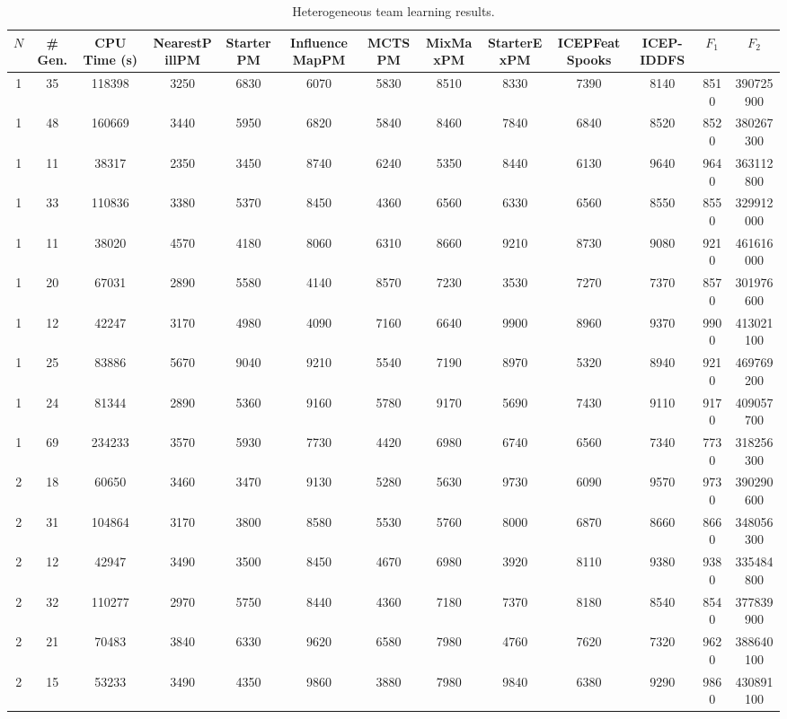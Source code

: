 \documentclass[journal]{IEEEtran}
\begin{document}
\begin{table}
\caption{Heterogeneous team learning results.}
\label{tab:results_heterogeneous}
\centering
\footnotesize
\begin{tabular}{|ccc|cccccccc|cc|}
\hline																				$N$	&	\# Gen.	&	CPU Time (s)	&	NearestPillPM	&	StarterPM	&	InfluenceMapPM	&	MCTSPM	&	MixMaxPM	&	StarterExPM	&	ICEPFeatSpooks	&	ICEP-IDDFS	&	$F_1$	&	$F_2$	\\
\hline																				1	&	35	&	118398	&	3250	&	6830	&	6070	&	5830	&	8510	&	8330	&	7390	&	8140	&	8510	&	390725900	\\
1	&	48	&	160669	&	3440	&	5950	&	6820	&	5840	&	8460	&	7840	&	6840	&	8520	&	8520	&	380267300	\\
1	&	11	&	38317	&	2350	&	3450	&	8740	&	6240	&	5350	&	8440	&	6130	&	9640	&	9640	&	363112800	\\
1	&	33	&	110836	&	3380	&	5370	&	8450	&	4360	&	6560	&	6330	&	6560	&	8550	&	8550	&	329912000	\\
1	&	11	&	38020	&	4570	&	4180	&	8060	&	6310	&	8660	&	9210	&	8730	&	9080	&	9210	&	461616000	\\
1	&	20	&	67031	&	2890	&	5580	&	4140	&	8570	&	7230	&	3530	&	7270	&	7370	&	8570	&	301976600	\\
1	&	12	&	42247	&	3170	&	4980	&	4090	&	7160	&	6640	&	9900	&	8960	&	9370	&	9900	&	413021100	\\
1	&	25	&	83886	&	5670	&	9040	&	9210	&	5540	&	7190	&	8970	&	5320	&	8940	&	9210	&	469769200	\\
1	&	24	&	81344	&	2890	&	5360	&	9160	&	5780	&	9170	&	5690	&	7430	&	9110	&	9170	&	409057700	\\
1	&	69	&	234233	&	3570	&	5930	&	7730	&	4420	&	6980	&	6740	&	6560	&	7340	&	7730	&	318256300	\\
\hline																				
2	&	18	&	60650	&	3460	&	3470	&	9130	&	5280	&	5630	&	9730	&	6090	&	9570	&	9730	&	390290600	\\
2	&	31	&	104864	&	3170	&	3800	&	8580	&	5530	&	5760	&	8000	&	6870	&	8660	&	8660	&	348056300	\\
2	&	12	&	42947	&	3490	&	3500	&	8450	&	4670	&	6980	&	3920	&	8110	&	9380	&	9380	&	335484800	\\
2	&	32	&	110277	&	2970	&	5750	&	8440	&	4360	&	7180	&	7370	&	8180	&	8540	&	8540	&	377839900	\\
2	&	21	&	70483	&	3840	&	6330	&	9620	&	6580	&	7980	&	4760	&	7620	&	7320	&	9620	&	388640100	\\
2	&	15	&	53233	&	3490	&	4350	&	9860	&	3880	&	7980	&	9840	&	6380	&	9290	&	9860	&	430891100	\\

\end{tabular}
\end{table}
\end{document}

